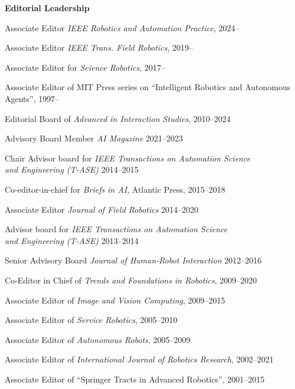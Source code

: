 \documentclass{article}
\begin{document}
\begin{cv}
	\begin{cvlist} {\bf Editorial Leadership}
		\item Associate Editor {\em IEEE Robotics and Automation Practice}, \cftdotfill{\cftdotsep} 2024--
		\item Associate Editor {\em IEEE Trans.\/ Field Robotics}, \cftdotfill{\cftdotsep} 2019--
		\item Associate Editor for {\em Science Robotics}, \cftdotfill{\cftdotsep} 2017--
		\item Associate Editor of MIT Press series on ``Intelligent Robotics and Autonomous Agents'',\cftdotfill{\cftdotsep} 1997--
		\item Editorial Board of {\em Advanced in Interaction Studies},\cftdotfill{\cftdotsep} 2010--2024
		\item Advisory Board Member {\em AI Magazine}\@ \cftdotfill{\cftdotsep} 2021--2023
		\item Chair Advisor board for {\em IEEE Transactions on Automation
				Science\\ and Engineering (T-ASE)}  \cftdotfill{\cftdotsep} 2014--2015
		\item Co-editor-in-chief for {\em Briefs in AI}, Atlantic Press,
		\cftdotfill{\cftdotsep}  2015--2018
		\item Associate Editor {\em Journal of Field Robotics}
		\cftdotfill{\cftdotsep} 2014--2020
		\item Advisor board for {\em IEEE Transactions on Automation
				Science\\ and Engineering (T-ASE)} \cftdotfill{\cftdotsep} 2013--2014
		\item Senior Advisory Board {\em Journal of Human-Robot Interaction}
		\cftdotfill{\cftdotsep} 2012--2016
		\item Co-Editor in Chief of {\em Trends and Foundations in
				Robotics}, \cftdotfill{\cftdotsep} 2009--2020
		\item Associate Editor of {\em Image and Vision
				Computing},\cftdotfill{\cftdotsep} 2009--2015
		\item Associate Editor of {\em Service Robotics},
		\cftdotfill{\cftdotsep} 2005--2010
		\item Associate Editor of {\em Autonomous Robots},
		\cftdotfill{\cftdotsep} 2005--2009
		\item Associate Editor of {\em International Journal of Robotics
				Research},\cftdotfill{\cftdotsep} 2002--2021
		\item Associate Editor of ``Springer Tracts in Advanced
		Robotics'',\cftdotfill{\cftdotsep} 2001--2015

\end{cvlist}
\end{cv}
\end{document}
